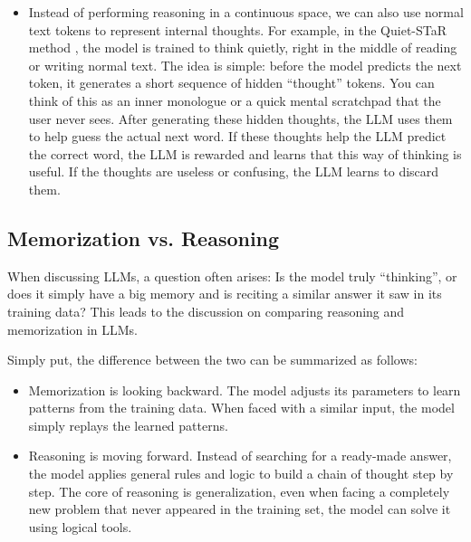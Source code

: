 \begin{itemize}
\item \vspace{0.3cm} Instead of performing reasoning in a continuous space, we can also use normal text tokens to represent internal thoughts. For example, in the Quiet-STaR method \cite{zelikman-etal:2024quietstar}, the model is trained to think quietly, right in the middle of reading or writing normal text. The idea is simple: before the model predicts the next token, it generates a short sequence of hidden ``thought'' tokens. You can think of this as an inner monologue or a quick mental scratchpad that the user never sees. After generating these hidden thoughts, the LLM uses them to help guess the actual next word. If these thoughts help the LLM predict the correct word, the LLM is rewarded and learns that this way of thinking is useful. If the thoughts are useless or confusing, the LLM learns to discard them.
\end{itemize}
\vspace{0.5cm}

\subsection{Memorization vs. Reasoning}

When discussing LLMs, a question often arises: Is the model truly ``thinking'', or does it simply have a big memory and is reciting a similar answer it saw in its training data? This leads to the discussion on comparing reasoning and memorization in LLMs.

Simply put, the difference between the two can be summarized as follows:

\begin{itemize}
\item \vspace{0.5cm} Memorization is looking backward. The model adjusts its parameters to learn patterns from the training data. When faced with a similar input, the model simply replays the learned patterns.
\item \vspace{0.3cm} Reasoning is moving forward. Instead of searching for a ready-made answer, the model applies general rules and logic to build a chain of thought step by step. The core of reasoning is generalization, even when facing a completely new problem that never appeared in the training set, the model can solve it using logical tools.
\end{itemize}
\vspace{0.5cm}


